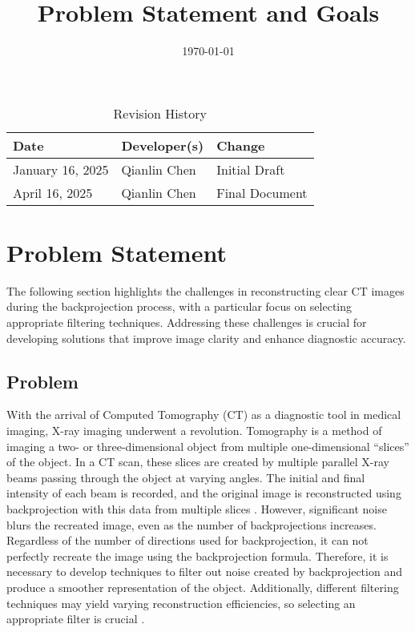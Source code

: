 \documentclass{article}
\title{Problem Statement and Goals\\\progname}
\author{\authname}
\date{\today}
\begin{document}

\maketitle

\begin{table}[hp]
\caption{Revision History} \label{TblRevisionHistory}
\begin{tabularx}{\textwidth}{llX}
\toprule
\textbf{Date} & \textbf{Developer(s)} & \textbf{Change}\\
\midrule
  January 16, 2025 & Qianlin Chen & Initial Draft \\
  April 16, 2025 & Qianlin Chen & Final Document \\
\bottomrule
\end{tabularx}
\end{table}

\section{Problem Statement}
The following section highlights the challenges in reconstructing clear CT
images during the backprojection process, with a particular focus on selecting
appropriate filtering techniques. Addressing these challenges is crucial for
developing solutions that improve image clarity and enhance diagnostic accuracy.

\subsection{Problem}
With the arrival of Computed Tomography (CT) as a diagnostic tool in medical
imaging, X-ray imaging underwent a revolution. Tomography is a method of imaging
a two- or three-dimensional object from multiple one-dimensional ``slices'' of
the object. In a CT scan, these slices are created by multiple parallel X-ray
beams passing through the object at varying angles. The initial and final
intensity of each beam is recorded, and the original image is reconstructed
using backprojection with this data from multiple slices \cite{Beatty2012}.
\newline However, significant noise blurs the recreated image, even as the number of
backprojections increases. Regardless of the number of directions used for
backprojection, it can not perfectly recreate the image using the backprojection
formula\cite{Beatty2012}. Therefore, it is necessary to develop techniques to filter out noise
created by backprojection and produce a smoother representation of the object.
Additionally, different filtering techniques may yield varying reconstruction
efficiencies, so selecting an appropriate filter is crucial \cite{Lyra2011}.
\end{document}
